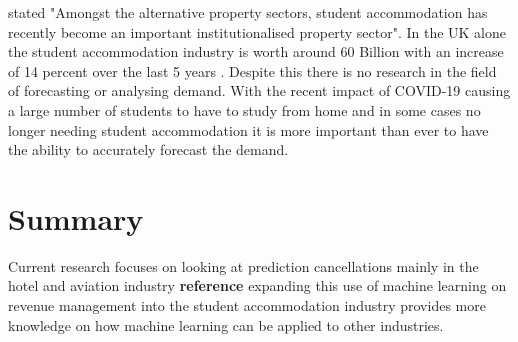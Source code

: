 \vspace{5mm}

\cite{Newell2018TheSector} stated "Amongst the alternative property sectors, student accommodation has recently become an important institutionalised property sector". In the UK alone the student accommodation industry is worth around 60 Billion \cite{UKWakefield} with an increase of 14 percent over the last 5 years \cite{UKWakefield}. Despite this there is no research in the field of forecasting or analysing demand. With the recent impact of COVID-19 causing a large number of students to have to study from home and in some cases no longer needing student accommodation it is more important than ever to have the ability to accurately forecast the demand. 


\section{Summary}

Current research focuses on looking at prediction cancellations mainly in the hotel and aviation industry \textbf{reference} expanding this use of machine learning on revenue management into the student accommodation industry provides more knowledge on how machine learning can be applied to other industries. 


